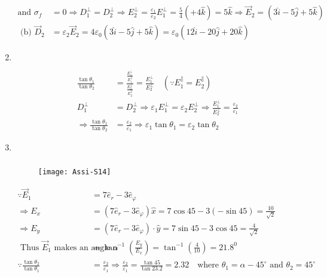 \begin{enumerate}
\begin{answer}
\begin{align*}
		\text{and }\sigma_{f}&=0 \Rightarrow D_{1}^{\perp}=D_{2}^{\perp} \Rightarrow E_{2}^{\perp}=\frac{\varepsilon_{1}}{\varepsilon_{2}} E_{1}^{\perp}=\frac{5}{4}(+4 \hat{k})=5 \hat{k} \Rightarrow \vec{E}_{2}=(3 \hat{i}-5 \hat{j}+5 \hat{k})\\
	\text{	(b) }\vec{D}_{2}&=\varepsilon_{2} \vec{E}_{2}=4 \varepsilon_{0}(3 \hat{i}-5 \hat{j}+5 \hat{k})=\varepsilon_{0}(12 \hat{i}-20 \hat{j}+20 \hat{k})
		\end{align*}
	\end{answer}
	\item $\left. \right. $
	\begin{answer}
		\begin{align*}
		\frac{\tan \theta_{1}}{\tan \theta_{2}}&=\frac{\frac{E_{1}^{\perp}}{E_{1}^{\|}}}{\frac{E_{2}^{\perp}}{E_{2}^{\|}}}=\frac{E_{1}^{\perp}}{E_{2}^{\perp}} \quad\left(\because E_{1}^{\|}=E_{2}^{\|}\right)\\
		D_{1}^{\perp}&=D_{2}^{\perp} \Rightarrow \varepsilon_{1} E_{1}^{\perp}=\varepsilon_{2} E_{2}^{\perp} \Rightarrow \frac{E_{1}^{\perp}}{E_{2}^{\perp}}=\frac{\varepsilon_{2}}{\varepsilon_{1}} \\
		\Rightarrow \frac{\tan \theta_{1}}{\tan \theta_{2}}&=\frac{\varepsilon_{2}}{\varepsilon_{1}} \Rightarrow \varepsilon_{1} \tan \theta_{1}=\varepsilon_{2} \tan \theta_{2}
		\end{align*}
	\end{answer}
	\item $\left. \right. $
	\begin{answer}$\left. \right. $
		\begin{figure}[H]
			\centering
			\texttt{[image: Assi-S14]}
		\end{figure}
		\begin{align*}
	\because \vec{E}_{1}&=7 \hat{e}_{r}-3 \hat{e}_{\varphi}\\
		\Rightarrow E_{x}&=\left(7 \hat{e}_{r}-3 \hat{e}_{\varphi}\right) \hat{x}=7 \cos 45-3(-\sin 45)=\frac{10}{\sqrt{2}} \\
		\Rightarrow E_{y}&=\left(7 \hat{e}_{r}-3 \hat{e}_{\varphi}\right) \cdot \hat{y}=7 \sin 45-3 \cos 45=\frac{4}{\sqrt{2}} \\
		\text { Thus } \vec{E}_{1} \text { makes an angle } \alpha&=\tan ^{-1}\left(\frac{E_{y}}{E_{x}}\right)=\tan ^{-1}\left(\frac{4}{10}\right)=21.8^{0}\\
		\because \frac{\tan \theta_{2}}{\tan \theta_{1}}&=\frac{\varepsilon_{2}}{\varepsilon_{1}} \Rightarrow \frac{\varepsilon_{2}}{\varepsilon_{1}}=\frac{\tan 45}{\tan 23.2}=2.32 \quad \text{where }\theta_{1}=\alpha-45^{\circ}\text{ and }\theta_{2}=45^{\circ}

\end{align*}
\end{answer}
\end{enumerate}

